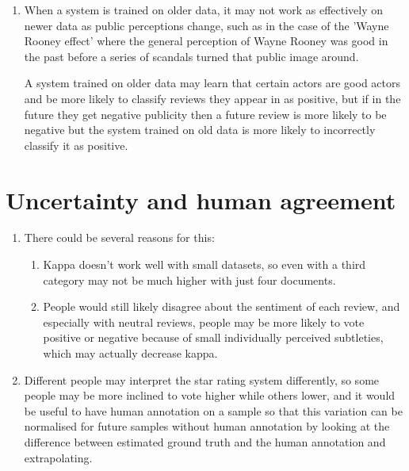 \documentclass[12pt]{article}
\begin{document}
\begin{enumerate}
    \item When a system is trained on older data, it may not work as effectively on newer data as public perceptions change, such as in the case of the 'Wayne Rooney effect' where the general perception of Wayne Rooney was good in the past before a series of scandals turned that public image around.

          A system trained on older data may learn that certain actors are good actors and be more likely to classify reviews they appear in as positive, but if in the future they get negative publicity then a future review is more likely to be negative but the system trained on old data is more likely to incorrectly classify it as positive.
\end{enumerate}
\section*{Uncertainty and human agreement}
\begin{enumerate}
    \item There could be several reasons for this:
    \begin{enumerate}
        \item Kappa doesn't work well with small datasets, so even with a third category may not be much higher with just four documents.
        \item People would still likely disagree about the sentiment of each review, and especially with neutral reviews, people may be more likely to vote positive or negative because of small individually perceived subtleties, which may actually decrease kappa.
    \end{enumerate}
    \item Different people may interpret the star rating system differently, so some people may be more inclined to vote higher while others lower, and it would be useful to have human annotation on a sample so that this variation can be normalised for future samples without human annotation by looking at the difference between estimated ground truth and the human annotation and extrapolating.
\end{enumerate}
\end{document}
